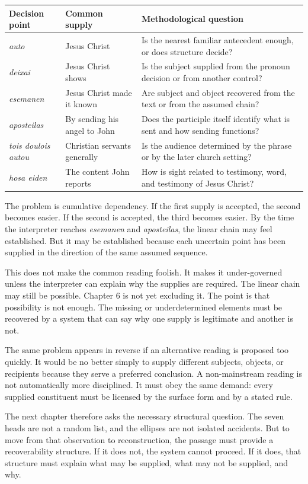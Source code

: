 \begin{center}
\begin{longtable}{@{}L{0.26\textwidth}L{0.31\textwidth}L{0.31\textwidth}@{}}
\toprule
Decision point & Common supply & Methodological question \\
\midrule
\textit{auto} & Jesus Christ & Is the nearest familiar antecedent enough, or does structure decide? \\
\textit{deixai} & Jesus Christ shows & Is the subject supplied from the pronoun decision or from another control? \\
\textit{esemanen} & Jesus Christ made it known & Are subject and object recovered from the text or from the assumed chain? \\
\textit{aposteilas} & By sending his angel to John & Does the participle itself identify what is sent and how sending functions? \\
\textit{tois doulois autou} & Christian servants generally & Is the audience determined by the phrase or by the later church setting? \\
\textit{hosa eiden} & The content John reports & How is sight related to testimony, word, and testimony of Jesus Christ? \\
\bottomrule
\end{longtable}
\end{center}

The problem is cumulative dependency. If the first supply is accepted, the second becomes easier. If the second is accepted, the third becomes easier. By the time the interpreter reaches \textit{esemanen} and \textit{aposteilas}, the linear chain may feel established. But it may be established because each uncertain point has been supplied in the direction of the same assumed sequence.

This does not make the common reading foolish. It makes it under-governed unless the interpreter can explain why the supplies are required. The linear chain may still be possible. Chapter 6 is not yet excluding it. The point is that possibility is not enough. The missing or underdetermined elements must be recovered by a system that can say why one supply is legitimate and another is not.

The same problem appears in reverse if an alternative reading is proposed too quickly. It would be no better simply to supply different subjects, objects, or recipients because they serve a preferred conclusion. A non-mainstream reading is not automatically more disciplined. It must obey the same demand: every supplied constituent must be licensed by the surface form and by a stated rule.

The next chapter therefore asks the necessary structural question. The seven heads are not a random list, and the ellipses are not isolated accidents. But to move from that observation to reconstruction, the passage must provide a recoverability structure. If it does not, the system cannot proceed. If it does, that structure must explain what may be supplied, what may not be supplied, and why.
